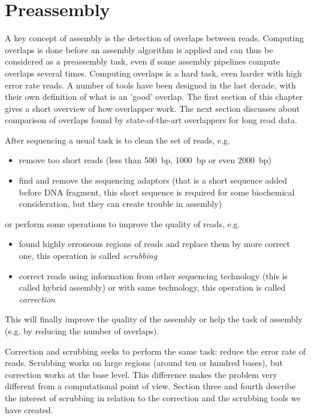 \documentclass[main.tex]{subfiles}
\begin{document}
\chapter{Preassembly}\label{chapter:preassembly}

A key concept of assembly is the detection of overlaps between reads. Computing overlaps is done before an assembly algorithm is applied and can thus be considered as a preassembly task, even if some assembly pipelines compute overlaps several times. Computing overlaps is a hard task, even harder with high error rate reads. A number of tools have been designed in the last decade, with their own definition of what is an 'good' overlap. The first section of this chapter gives a short overview of how overlapper work. The next section discusses about comparison of overlaps found by state-of-the-art overlappers for long read data. 


\bigskip

After sequencing a usual task is to clean the set of reads, e.g.
\begin{itemize}
	\item remove too short reads (less than 500~bp, 1000~bp or even 2000~bp)
	\item find and remove the sequencing adaptors (that is a short sequence added before DNA fragment, this short sequence is required for some biochemical consideration, but they can create trouble in assembly)
\end{itemize}
or perform some operations to improve the quality of reads, e.g.
\begin{itemize}
	\item found highly erroneous regions of reads and replace them by more correct one, this operation is called \emph{scrubbing}
	\item correct reads using information from other sequencing technology (this is called hybrid assembly) or with same technology, this operation is called \emph{correction} 
\end{itemize}
This will finally improve the quality of the assembly or help the task of assembly (e.g. by reducing the number of overlaps). 

Correction and scrubbing seeks to perform the same task: reduce the error rate of reads. Scrubbing works on large regions (around ten or hundred bases), but correction works at the base level. This difference makes the problem very different from a computational point of view. Section three and fourth describe the interest of scrubbing in relation to the correction and the scrubbing tools we have created.
\end{document}
